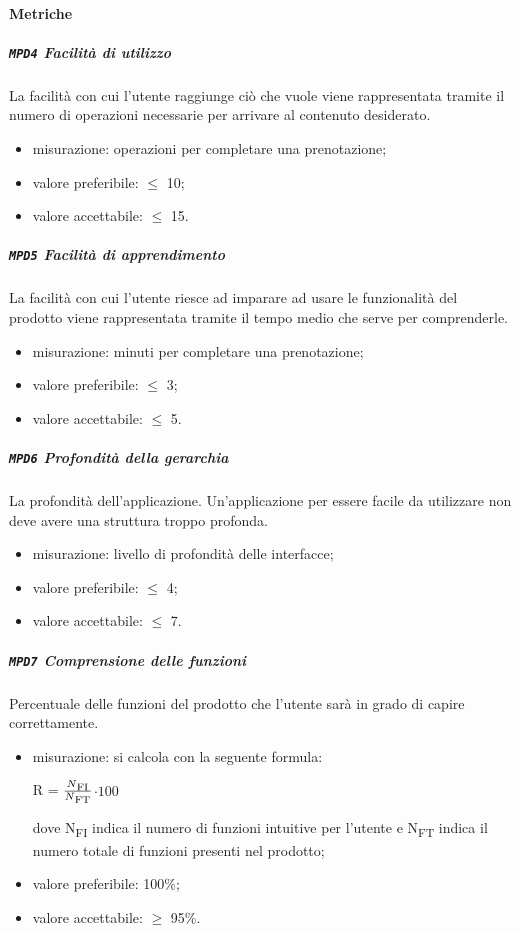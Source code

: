 		\paragraph{Metriche}
			\subparagraph{\texttt{MPD4} Facilità di utilizzo}
			La facilità con cui l'utente raggiunge ciò che vuole viene rappresentata tramite il numero di operazioni necessarie per arrivare al contenuto desiderato.
			\begin{itemize}
			\item misurazione: operazioni per completare una prenotazione;
			\item valore preferibile: $\leq$ 10;
			\item valore accettabile: $\leq$ 15.
			\end{itemize}
			\subparagraph{\texttt{MPD5} Facilità di apprendimento}
			La facilità con cui l'utente riesce ad imparare ad usare le funzionalità del prodotto viene rappresentata tramite il tempo medio che serve per comprenderle.
			\begin{itemize}
			\item misurazione: minuti per completare una prenotazione;
			\item valore preferibile: $\leq$ 3;
			\item valore accettabile: $\leq$ 5.
			\end{itemize}
			\subparagraph{\texttt{MPD6} Profondità della gerarchia}
			La profondità dell'applicazione. Un'applicazione per essere facile da utilizzare non deve avere una struttura troppo profonda.
			\begin{itemize}
			\item misurazione: livello di profondità delle interfacce;
			\item valore preferibile: $\leq$ 4;
			\item valore accettabile: $\leq$ 7.
			\end{itemize}
			\subparagraph{\texttt{MPD7} Comprensione delle funzioni}
			Percentuale delle funzioni del prodotto che l'utente sarà in grado di capire correttamente.
			\begin{itemize}
				\item misurazione: si calcola con la seguente formula: \\
			\centerline{ R =  \(\frac{N\textsubscript{FI}}{N\textsubscript{FT}} \)$ \cdot 100$ }
			dove N\textsubscript{FI} indica il numero di funzioni intuitive per l'utente e N\textsubscript{FT} indica il numero totale di funzioni presenti nel prodotto;
				\item valore preferibile: 100\%;
				\item valore accettabile: $\geq$ 95\%.
			\end{itemize}
